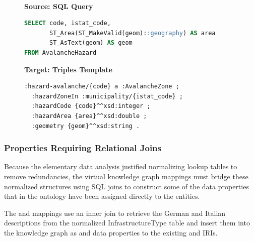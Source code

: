 \begin{figure}[ht!]
  \vspace*{-1mm}
  \textbf{\small{}} \\
  \begin{minipage}[t]{0.50\textwidth}
    \centering
    \textbf{\scriptsize Source: SQL Query}
\begin{lstlisting}[language=SQL]
SELECT code, istat_code,
       ST_Area(ST_MakeValid(geom)::geography) AS area
       ST_AsText(geom) AS geom
FROM AvalancheHazard
\end{lstlisting}
  \end{minipage}
  \hfill
  \begin{minipage}[t]{0.50\textwidth}
    \centering
    \textbf{\scriptsize Target: Triples Template}
\begin{lstlisting}[language=Turtle]
:hazard-avalanche/{code} a :AvalancheZone ;
  :hazardZoneIn :municipality/{istat_code} ;
  :hazardCode {code}^^xsd:integer ;
  :hazardArea {area}^^xsd:double ;
  :geometry {geom}^^xsd:string . 
\end{lstlisting}
  \end{minipage}
  \vspace*{-4mm}
\end{figure}


\subsubsection{Properties Requiring Relational Joins}

Because the elementary data analysis justified normalizing lookup tables to remove redundancies, the virtual knowledge graph mappings must bridge these normalized structures using SQL joins to construct some of the data properties that in the ontology have been assigned directly to the entities.

The  and  mappings use an inner join to retrieve the German and Italian descriptions from the normalized InfrastructureType table and insert them into the knowledge graph as  and  data properties to the existing  and  IRIs.

